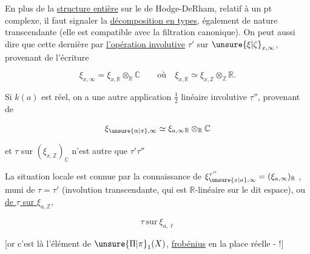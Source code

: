 En plus de la \uline{structure entière} sur le   de Hodge-DeRham, relatif à un pt complexe, il faut signaler la \uline{décomposition en types}, également de nature transcendante (elle est compatible avec la filtration canonique). On peut aussi dire que cette dernière   par \uline{l’opération involutive}  $\tau'$ sur $\unsure{\xi|\zeta}_{x,\infty}$, provenant de l’écriture

\[
\xi_{x,\infty}=\xi_{x,\mathbb{R}}\otimes_{\mathbb{R}}\mathbb{C}
\qquad\text{où}\quad \xi_{x,\mathbb{R}}\simeq\xi_{x,\mathbb{Z}}\otimes_{\mathbb{Z}}\mathbb{R}.
\]

Si $k(a)$ est réel, on a une autre application $\tfrac12$ linéaire involutive $\tau''$, provenant de

\[
\xi_{\unsure{\alpha|x},\infty}\simeq\xi_{a,\infty}{}_{\mathbb{R}}\otimes_{\mathbb{R}}\mathbb{C}
\]

et $\tau$ sur $(\xi_{x,\mathbb{Z}})_{\mathbb{C}}$ n’est autre que $\tau'\tau''$



La situation locale  est connue par la connaissance de $\xi_{\unsure{x|a},\infty}^{\tau''}=(\xi_{a,\infty})_{\mathbb{R}}$ , muni de $\tau=\tau'$ (involution transcendante, qui est $\mathbb{R}$-linéaire sur le dit espace), ou  \uline{ de $\tau$ sur $\xi_{a,\mathbb{Z}}$}, 

\[
\boxed{\tau\ \text{sur}\ \xi_{a,\ell}}
\]

[or c’est là  l’élément de $\unsure{\Pi|\pi}_1(X)$, \uline{frobénius} en la place  réelle - !]


